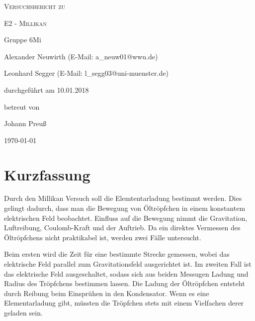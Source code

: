 \documentclass[
	a4paper,
	12pt,
	pagesize,
	ngerman
]{scrartcl}
\begin{document}
	
	\begin{titlepage}
		\centering
		{\scshape\LARGE Versuchsbericht zu \par}
		\vspace{1cm}
		{\scshape\huge E2 - Millikan \par}
		\vspace{2.5cm}
		{\LARGE Gruppe 6Mi \par}
		\vspace{0.5cm}
		
		{\large Alexander Neuwirth (E-Mail: a\_neuw01@wwu.de) \par}
		{\large Leonhard Segger (E-Mail: l\_segg03@uni-muenster.de) \par}
		\vfill
		
		durchgeführt am 10.01.2018\par
		betreut von\par
		{\large Johann Preuß}
		
		\vfill
		
		{\large \today\par}
	\end{titlepage}
	\tableofcontents
	\newpage
	
	\section{Kurzfassung}
	Durch den Millikan Versuch soll die Elemtentarladung bestimmt werden.
	Dies gelingt dadurch, dass man die Bewegung von Öltröpfchen in einem konstantem elektrischen Feld beobachtet.
	Einfluss auf die Bewegung nimmt die Gravitation, Luftreibung, Coulomb-Kraft und der Auftrieb.
	Da ein direktes Vermessen des Öltröpfchens nicht praktikabel ist, werden zwei Fälle untersucht.

	Beim ersten wird die Zeit für eine bestimmte Strecke gemessen, wobei das elektrische Feld parallel zum Gravitationsfeld ausgerichtet ist. 
	Im zweiten Fall ist das elektrische Feld ausgeschaltet, sodass sich aus beiden Messugen Ladung und Radius des Tröpfchens bestimmen lassen.
	Die Ladung der Öltröpfchen entsteht durch Reibung beim Einsprühen in den Kondensator. 
	Wenn es eine Elementarladung gibt, müssten die Tröpfchen stets mit einem Vielfachen derer geladen sein. %
\end{document}
